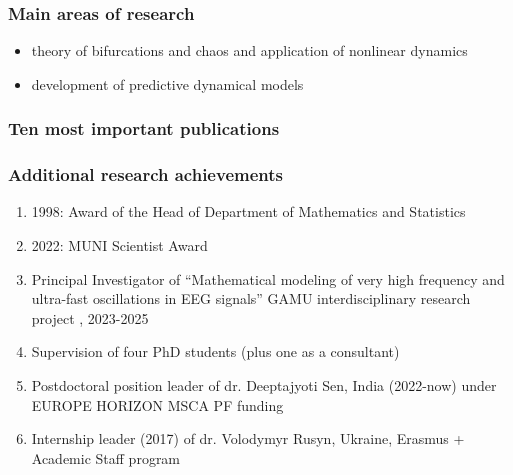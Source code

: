 \subsubsection*{Main areas of research}

\begin{itemize}
    \item{theory of bifurcations and chaos and application of nonlinear dynamics}
    \item{development of predictive dynamical models}
\end{itemize}


\subsubsection*{Ten most important publications}


\nocite{p:Eclerova2022}
\nocite{p:Smid2022}
\nocite{p:Berec2022}
\nocite{p:Hajnova2019}
\nocite{p:Pribylova2019}
\nocite{p:Hajnova2017}
\nocite{p:Pribylova2017}
\nocite{p:Pribylova2014}
\nocite{p:Pribylova2009}
\nocite{p:Kalas2002}

\begin{refcontext}[sorting=nyt,labelprefix=P]
    \printbibliography[heading=none]
\end{refcontext}

\endrefsection

\subsubsection*{Additional research achievements}

\begin{enumerate}
    \item 1998: Award of the Head of Department of Mathematics and Statistics
    \item 2022: MUNI Scientist Award
    \item Principal Investigator of ``Mathematical modeling of very high frequency and ultra-fast oscillations in EEG signals'' GAMU interdisciplinary research project , 2023-2025
    \item Supervision of four PhD students (plus one as a consultant)
    \item Postdoctoral position leader of dr. Deeptajyoti Sen, India (2022-now) under EUROPE HORIZON MSCA PF funding
    \item Internship leader (2017) of dr. Volodymyr Rusyn, Ukraine, Erasmus + Academic Staff program
\end{enumerate}

